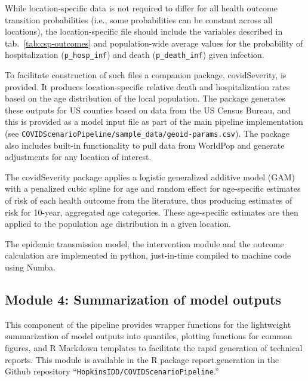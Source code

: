 {While location-specific data is not required to differ for all health outcome transition probabilities (i.e., some probabilities can be constant across all locations), the location-specific file should include the variables described in tab.~\ref{tab:csp-outcomes} and population-wide average values for the probability of hospitalization (\verb|p_hosp_inf|) and death (\verb|p_death_inf|) given infection.

To facilitate construction of such files a companion package, covidSeverity, is provided. It produces location-specific relative death and hospitalization rates based on the age distribution of the local population\cite{Lauer:HopkinsIDDCovidSeverityInitial:2020}. The package generates these outputs for US counties based on data from the US Census Bureau, and  this is provided as a model input file as part of the main pipeline implementation (see \verb|COVIDScenarioPipeline/sample_data/geoid-params.csv|). The package also includes built-in functionality to pull data from WorldPop and generate adjustments for any location of interest.

The covidSeverity package applies a logistic generalized additive model (GAM) with a penalized cubic spline for age and random effect for age-specific estimates of risk of each health outcome from the literature, thus producing estimates of risk for 10-year, aggregated age categories. These age-specific estimates are then applied to the population age distribution in a given location.

The epidemic transmission model, the intervention module and the outcome calculation are implemented in python, just-in-time compiled to machine code using Numba\cite{Lam:NumbaLLVMbasedPython:2015}. 


\subsection{Module 4: Summarization of model outputs}
This component of the pipeline provides wrapper functions for the lightweight summarization of model outputs into quantiles, plotting functions for common figures, and R Markdown templates to facilitate the rapid generation of technical reports. This module is available in the R package report.generation in the Github repository “\verb|HopkinsIDD/COVIDScenarioPipeline|.”

}
